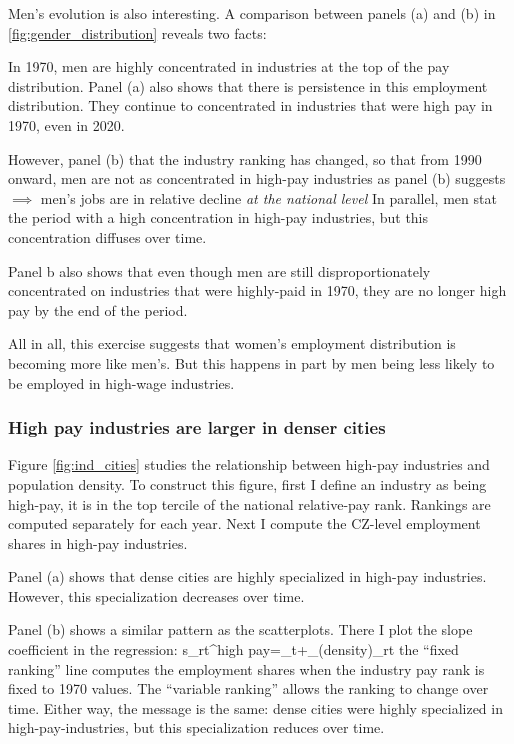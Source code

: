 Men's evolution is also interesting. A comparison between panels (a) and (b) in \ref{fig:gender_distribution} reveals two facts:
\benu
	\item In 1970, men are highly concentrated in industries at the top of the pay distribution. Panel (a) also shows that there is persistence in this employment distribution. They continue to concentrated in industries that were high pay in 1970, even in 2020.
	\item However, panel (b) that the industry ranking has changed, so that from 1990 onward, men are not as concentrated in high-pay industries as panel (b) suggests $\implies$ men's jobs are in relative decline \textit{at the national level} 
\eenu
In parallel, men stat the period with a high concentration in high-pay industries, but this concentration diffuses over time.

 Panel b also shows that even though men are still disproportionately concentrated on industries that were highly-paid in 1970, they are no longer high pay by the end of the period.

All in all, this exercise suggests that women's employment distribution is becoming more like men's. But this happens in part by men being less likely to be employed in high-wage industries.

\subsubsection{High pay industries are larger in denser cities}


Figure \ref{fig:ind_cities} studies the relationship between high-pay industries and population density. To construct this figure, first I define an industry as being high-pay, it is in the top tercile of the national relative-pay rank. Rankings are computed separately for each year. Next I compute the CZ-level employment shares in high-pay industries.
\bitem
	\item Panel (a) shows that dense cities are highly specialized in high-pay industries. However, this specialization decreases over time.
	\item Panel (b) shows a similar pattern as the scatterplots. There I plot the slope coefficient in the regression:
	\beqns
		s_{rt}^{high pay}=\alpha_t+\beta_{}\ln(density)_{rt}
	\eeqns
	the ``fixed ranking'' line computes the employment shares when the industry pay rank is fixed to 1970 values. The ``variable ranking'' allows the ranking to change over time. Either way, the message is the same: dense cities were highly specialized in high-pay-industries, but this specialization reduces over time.
\eitem


